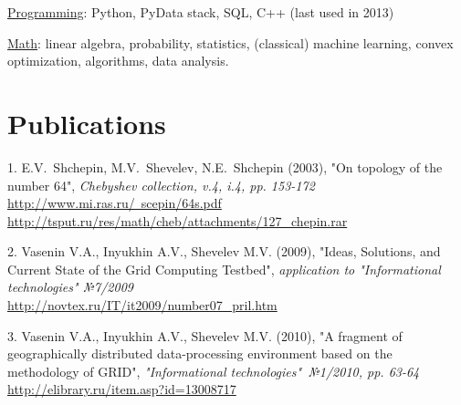 \documentclass[unicode,a4paper,10pt]{article}
\begin{document}
\underline{Programming}: Python, PyData stack, SQL, C++ (last used in 2013)

\underline{Math}: linear algebra, probability, statistics, (classical) machine learning, convex optimization, algorithms, data analysis.


 
\newpage
\section{Publications}
1. E.V.~Shchepin, M.V.~Shevelev, N.E.~Shchepin (2003), "On topology of the number 64",
\textit{Chebyshev collection, v.4, i.4, pp. 153-172}\\
\href{http://www.mi.ras.ru/~scepin/64s.pdf}{http://www.mi.ras.ru/~scepin/64s.pdf}\\
\href{http://tsput.ru/res/math/cheb/attachments/127_chepin.rar}{http://tsput.ru/res/math/cheb/attachments/127\_chepin.rar}

2. Vasenin V.A., Inyukhin A.V., Shevelev M.V. (2009), "Ideas, Solutions, and Current State of the Grid Computing Testbed", 
\textit{application to "Informational technologies" №7/2009}\\
\href{http://novtex.ru/IT/it2009/number07\_pril.htm}{http://novtex.ru/IT/it2009/number07\_pril.htm}

3. Vasenin V.A., Inyukhin A.V., Shevelev M.V. (2010), "A fragment of geographically distributed data-processing environment based on the methodology of GRID", 
\textit{"Informational technologies"\ №1/2010, pp. 63-64}\\
\href{http://elibrary.ru/item.asp?id=13008717}{http://elibrary.ru/item.asp?id=13008717}
\end{document}
